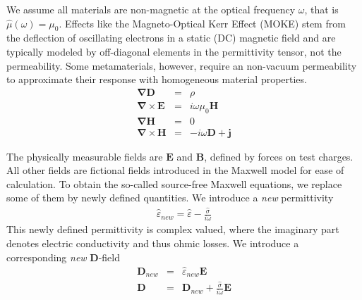 \documentclass[12pt,a4paper,twoside,openright,BCOR10mm,headsepline,titlepage,abstracton,chapterprefix,final]{scrreprt}
\newcommand\Vector[1]{{\mathbf{#1}}}
\newcommand\vacuum{0}
\newcommand\Nabla{\Vector{\nabla}}
\newcommand\Tensor[1]{\hat{#1}}
\newcommand\scalarEfield{E}
\newcommand\scalarBfield{B}
\newcommand\scalarHfield{H}
\newcommand\scalarDfield{D}
\newcommand\Efield{\Vector{\scalarEfield}}
\newcommand\Bfield{\Vector{\scalarBfield}}
\newcommand\Hfield{\Vector{\scalarHfield}}
\newcommand\Dfield{\Vector{\scalarDfield}}
\newcommand\permeability{\Tensor{\scalarpermeability}}
\newcommand\vacuumpermeability{\scalarpermeability_{\vacuum}}
\newcommand\scalarpermeability{\mu}
\newcommand\permittivity{\Tensor{\scalarpermittivity}}
\newcommand\scalarpermittivity{\varepsilon}
\newcommand\conductivity{\Tensor{\sigma}}
\newcommand\currentdensity{\Vector{j}}
\newcommand\chargedensity{\rho}
\begin{document}
We assume all materials are non-magnetic at the optical frequency $\omega$, that is $\permeability(\omega) = \vacuumpermeability$. 
Effects like the Magneto-Optical Kerr Effect (MOKE) stem from the deflection of oscillating electrons in a static (DC) magnetic field and are typically modeled by off-diagonal elements in the permittivity tensor, not the permeability.
Some metamaterials, however, require an non-vacuum permeability to approximate their response with homogeneous material properties. 
\begin{subequations}
\begin{eqnarray}
  \Nabla \Dfield &=& \chargedensity 					\\
  \Nabla \times \Efield &=& i \omega \vacuumpermeability \Hfield	\\
  \Nabla \Hfield &=& 0  					\\
  \Nabla \times \Hfield &=& - i \omega \Dfield + \currentdensity  		
\end{eqnarray}
\end{subequations}

The physically measurable fields are $\Efield$ and $\Bfield$, defined by forces on test charges. All other fields are fictional fields introduced in the Maxwell model for ease of calculation.
To obtain the so-called source-free Maxwell equations, we replace some of them by newly defined quantities.
We introduce a \emph{new} permittivity
\begin{eqnarray}
  \permittivity_{new} = \permittivity - \frac{\conductivity}{i \omega}
\end{eqnarray}
This newly defined permittivity is complex valued, where the imaginary part denotes electric conductivity and thus ohmic losses.
We introduce a corresponding \emph{new} $\Dfield$-field
\begin{eqnarray}
  \Dfield_{new} &=& \permittivity_{new} \Efield \\
  \Dfield &=& \Dfield_{new} + \frac{\conductivity}{i \omega} \Efield
\end{eqnarray}
\end{document}
